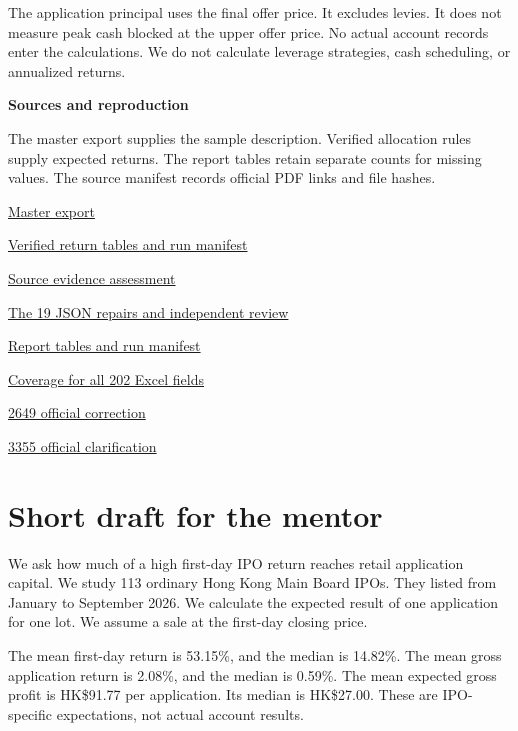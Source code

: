 \documentclass[10pt,a4paper]{article}
\begin{document}
The application principal uses the final offer price. It excludes levies. It does not measure peak cash blocked at the upper offer price. No actual account records enter the calculations. We do not calculate leverage strategies, cash scheduling, or annualized returns.


\par\addvspace{4pt}\textbf{Sources and reproduction}\par\nobreak
The master export supplies the sample description. Verified allocation rules supply expected returns. The report tables retain separate counts for missing values. The source manifest records official PDF links and file hashes.


\noindent\href{../../pipeline/exports/HKIPO-MB-MASTER_clean.csv}{Master export}\par
\noindent\href{../../analysis/out/retail_evidence_brief/README.md}{Verified return tables and run manifest}\par
\noindent\href{RETAIL_EVIDENCE_ASSESSMENT_2026-10-03.md}{Source evidence assessment}\par
\noindent\href{../../pipeline/reports/data_gap_collection/source_followup_2026-10-03/formal_json_repair/README.md}{The 19 JSON repairs and independent review}\par
\noindent\href{../../analysis/out/retail_2026_report/run_manifest.json}{Report tables and run manifest}\par
\noindent\href{../../analysis/out/retail_2026_report/workbook_field_coverage.csv}{Coverage for all 202 Excel fields}\par
\noindent\href{https://www.hkexnews.hk/listedco/listconews/sehk/2026/0311/2026031100837_c.pdf}{2649 official correction}\par
\noindent\href{https://www1.hkexnews.hk/listedco/listconews/sehk/2026/0327/2026032702666.pdf}{3355 official clarification}\par
\clearpage
\section*{Short draft for the mentor}
We ask how much of a high first-day IPO return reaches retail application capital. We study 113 ordinary Hong Kong Main Board IPOs. They listed from January to September 2026. We calculate the expected result of one application for one lot. We assume a sale at the first-day closing price.


The mean first-day return is 53.15\%, and the median is 14.82\%. The mean gross application return is 2.08\%, and the median is 0.59\%. The mean expected gross profit is HK\$91.77 per application. Its median is HK\$27.00. These are IPO-specific expectations, not actual account results.
\end{document}
